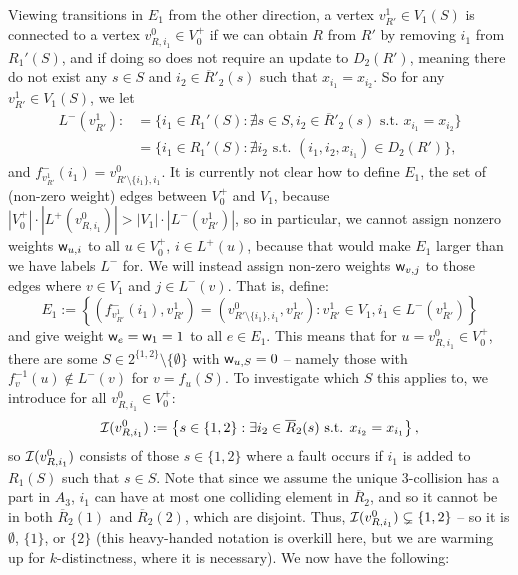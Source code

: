 \documentclass{article}
\renewcommand{\>}{\rangle}
\newcommand{\<}{\langle}
\renewcommand{\(}{\left(}
\renewcommand{\)}{\right)}
\def\w{{\sf w}}
\begin{document}
Viewing transitions in $E_1$ from the other direction, a vertex $v^1_{R'} \in V_1(S)$ is connected to a vertex $v_{R,i_1}^0\in V_0^+$ if we can obtain $R$ from $R'$ by removing $i_1$ from $R_1'(S)$, and if doing so does not require an update to $D_2(R')$, meaning there do not exist any $s \in S$ and $i_2\in \overline{R}'_2(s)$ such that $x_{i_1}=x_{i_2}$. So for any $v^1_{R'}\in V_1(S)$, we let
\begin{equation}
\begin{split}
	L^-(v_{R'}^1):&=\{i_1 \in R_1'(S): \nexists s \in S, i_2\in \overline{R}'_2(s)\mbox{ s.t. }x_{i_1}=x_{i_2} \} \\
	&=\{i_1\in R_1'(S):\nexists i_2\mbox{ s.t. }(i_1,i_2,x_{i_1})\in D_2(R')\},
\end{split}\label{eq:3-dist-L-minus-1}
\end{equation}
and $f^-_{v_{R'}^1}(i_1) = v^0_{R'\setminus \{i_1\},i_1}$. It is currently not clear how to define $E_1$, the set of (non-zero weight) edges between $V_0^+$ and $V_1$, because $|V_0^+|\cdot |L^+(v_{R,i_1}^0)| > |V_1|\cdot |L^-(v_{R'}^1)|$, so in particular, we cannot assign nonzero weights $\w_{u,i}$ to all $u\in V_0^+$, $i\in L^+(u)$, because that would make $E_1$ larger than we have labels $L^-$ for. We will instead assign non-zero weights $\w_{v,j}$ to those edges where $v \in V_1$ and $j\in L^-(v)$. That is, define:
$$E_1 := \left\{\left(f^-_{v_{R'}^1}(i_1),v^1_{R'}\right)= \left(v^0_{R'\setminus \{i_1\},i_1},v^1_{R'}\right): v^1_{R'} \in V_1, i_1 \in L^-(v_{R'}^1)\right\}$$
and give weight $\w_e = \w_1 = 1$ to all $e \in E_1$. This means that for $u=v_{R,i_1}^0\in V_0^+$, there are some $S\in 2^{\{1,2\}}\setminus\{\emptyset\}$ with $\w_{u,S}=0$ -- namely those with $f_v^{-1}(u)\not\in L^-(v)$ for $v=f_u(S)$. To investigate which $S$ this applies to, we introduce for all $v_{R,i_1}^0\in V_0^+$:
\begin{equation}
{\cal I}(v^{0}_{R,i_1}):=\left\{s\in \{1,2\}: \exists i_{2}\in \overline{R}_{2}(s)\mbox{ s.t. }x_{i_2}=x_{i_1}\right\},\label{eq:3-dist-cal-I}
\end{equation}
so ${\cal I}(v^{0}_{R,i_1})$ consists of those $s \in \{1,2\}$ where a fault occurs if $i_1$ is added to $R_1(S)$ such that $s\in S$. Note that since we assume the unique 3-collision has a part in $A_3$, $i_1$ can have at most one colliding element in $\overline{R}_2$, and so it cannot be in both $\overline{R}_2(1)$ and $\overline{R}_2(2)$, which are disjoint. Thus, ${\cal I}(v^{0}_{R,i_1}) \subsetneq \{1,2\}$ -- so it is $\emptyset$, $\{1\}$, or $\{2\}$ (this heavy-handed notation is overkill here, but we are warming up for $k$-distinctness, where it is necessary). We now have the following:
\end{document}
